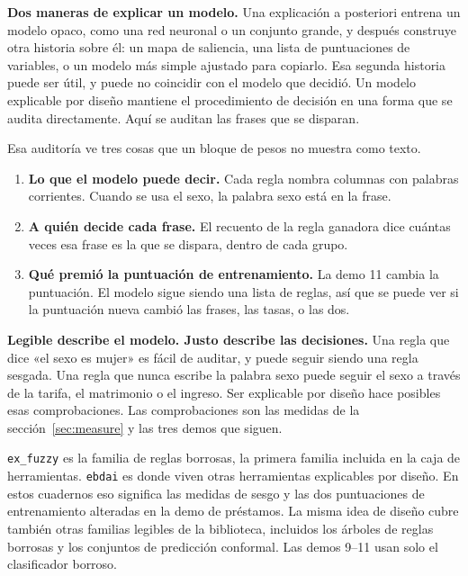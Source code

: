 \documentclass[11pt]{article}
\newcommand{\fn}[1]{\texttt{\small #1}}
\begin{document}
\begin{idea}
\textbf{Dos maneras de explicar un modelo.} Una explicación a posteriori entrena un modelo opaco, como una red neuronal o un conjunto grande, y después construye otra historia sobre él: un mapa de saliencia, una lista de puntuaciones de variables, o un modelo más simple ajustado para copiarlo. Esa segunda historia puede ser útil, y puede no coincidir con el modelo que decidió. Un modelo explicable por diseño mantiene el procedimiento de decisión en una forma que se audita directamente. Aquí se auditan las frases que se disparan.
\end{idea}

Esa auditoría ve tres cosas que un bloque de pesos no muestra como texto.

\begin{enumerate}
  \item \textbf{Lo que el modelo puede decir.} Cada regla nombra columnas con palabras corrientes. Cuando se usa el sexo, la palabra sexo está en la frase.
  \item \textbf{A quién decide cada frase.} El recuento de la regla ganadora dice cuántas veces esa frase es la que se dispara, dentro de cada grupo.
  \item \textbf{Qué premió la puntuación de entrenamiento.} La demo 11 cambia la puntuación. El modelo sigue siendo una lista de reglas, así que se puede ver si la puntuación nueva cambió las frases, las tasas, o las dos.
\end{enumerate}

\begin{careful}
\textbf{Legible describe el modelo. Justo describe las decisiones.} Una regla que dice «el sexo es mujer» es fácil de auditar, y puede seguir siendo una regla sesgada. Una regla que nunca escribe la palabra sexo puede seguir el sexo a través de la tarifa, el matrimonio o el ingreso. Ser explicable por diseño hace posibles esas comprobaciones. Las comprobaciones son las medidas de la sección~\ref{sec:measure} y las tres demos que siguen.
\end{careful}

\fn{ex\_fuzzy} es la familia de reglas borrosas, la primera familia incluida en la caja de herramientas. \fn{ebdai} es donde viven otras herramientas explicables por diseño. En estos cuadernos eso significa las medidas de sesgo y las dos puntuaciones de entrenamiento alteradas en la demo de préstamos. La misma idea de diseño cubre también otras familias legibles de la biblioteca, incluidos los árboles de reglas borrosas y los conjuntos de predicción conformal. Las demos 9--11 usan solo el clasificador borroso.
\end{document}
